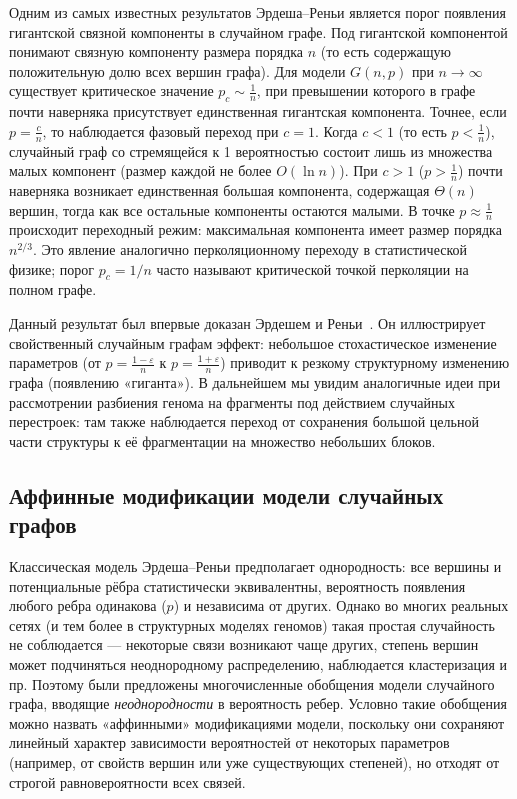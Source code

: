Одним из самых известных результатов Эрдеша–Реньи является порог появления гигантской связной компоненты в случайном графе.
Под гигантской компонентой понимают связную компоненту размера порядка $n$ (то есть содержащую положительную долю всех вершин графа).
Для модели $G(n,p)$ при $n \to \infty$ существует критическое значение $p_c \sim \frac{1}{n}$, при превышении которого в графе почти наверняка присутствует единственная гигантская компонента. 
Точнее, если $p = \frac{c}{n}$, то наблюдается фазовый переход при $c=1$.
Когда $c < 1$ (то есть $p < \frac{1}{n}$), случайный граф со стремящейся к 1 вероятностью состоит лишь из множества малых компонент (размер каждой не более $O(\ln n)$).
При $c > 1$ ($p > \frac{1}{n}$) почти наверняка возникает единственная большая компонента, содержащая $\Theta(n)$ вершин, тогда как все остальные компоненты остаются малыми.
В точке $p \approx \frac{1}{n}$ происходит переходный режим: максимальная компонента имеет размер порядка $n^{2/3}$.
Это явление аналогично перколяционному переходу в статистической физике; порог $p_c = 1/n$ часто называют критической точкой перколяции на полном графе.

Данный результат был впервые доказан Эрдешем и Реньи~\cite{Erdos1959}.
Он иллюстрирует свойственный случайным графам эффект: небольшое стохастическое изменение параметров (от $p = \frac{1-\varepsilon}{n}$ к $p = \frac{1+\varepsilon}{n}$) приводит к резкому структурному изменению графа (появлению «гиганта»).
В дальнейшем мы увидим аналогичные идеи при рассмотрении разбиения генома на фрагменты под действием случайных перестроек: там также наблюдается переход от сохранения большой цельной части структуры к её фрагментации на множество небольших блоков.

\subsection{Аффинные модификации модели случайных графов}
\label{subsec:affine_modifications}

Классическая модель Эрдеша–Реньи предполагает однородность: все вершины и потенциальные рёбра статистически эквивалентны, вероятность появления любого ребра одинакова ($p$) и независима от других.
Однако во многих реальных сетях (и тем более в структурных моделях геномов) такая простая случайность не соблюдается — некоторые связи возникают чаще других, степень вершин может подчиняться неоднородному распределению, наблюдается кластеризация и пр. Поэтому были предложены многочисленные обобщения модели случайного графа, вводящие \textit{неоднородности} в вероятность ребер. Условно такие обобщения можно назвать «аффинными» модификациями модели, поскольку они сохраняют линейный характер зависимости вероятностей от некоторых параметров (например, от свойств вершин или уже существующих степеней), но отходят от строгой равновероятности всех связей.

